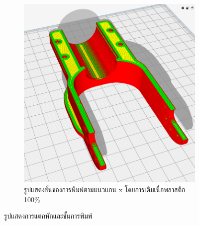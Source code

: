 \begin{figure}[h!]
\begin{subfigure}[b]{0.4\linewidth}
        \includegraphics[width=\linewidth]{chapter4/images/fatigue3.png}
        \caption{รูปแสดงชั้นของการพิมพ์ตามแนวแกน x โดยการเติมเนื่อพลาสติก 100\%}
    \end{subfigure}
    \caption{รูปแสดงการแตกหักและชั้นการพิมพ์}
    \label{fig:fatiguelayer}
  \end{figure}

